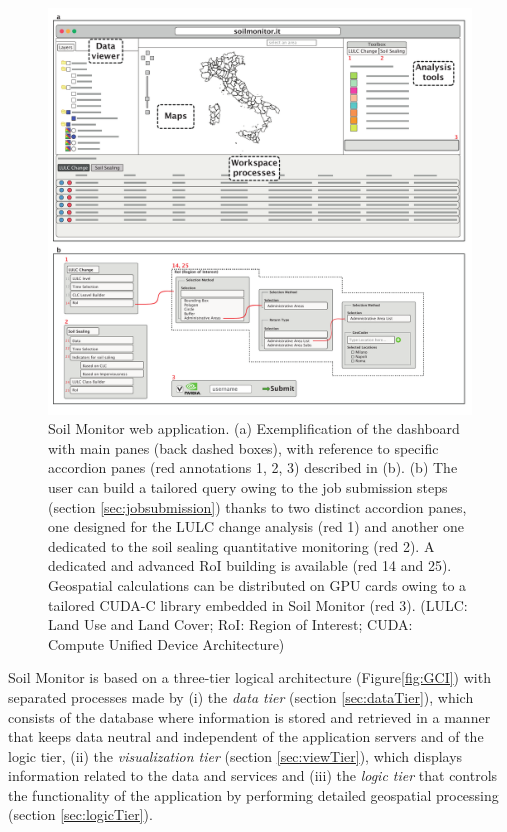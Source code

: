 \documentclass[APA,LATO1COL,doublespace]{WileyNJD-v2}
\begin{document}
\begin{figure}[t] %
    \centerline{\includegraphics[width=500pt]{01_piattaforma.pdf}}
    \caption{Soil Monitor web application.
             (a) Exemplification of the dashboard with main panes (back dashed boxes), with reference to specific accordion panes (red annotations 1, 2, 3) described in (b). 
             (b) The user can build a tailored query owing to the job submission steps (section \ref{sec:jobsubmission}) thanks to two distinct accordion panes, one designed for the LULC change analysis (red 1) and another one dedicated to the soil sealing quantitative monitoring (red 2). A dedicated and advanced RoI building is available (red 14 and 25). Geospatial calculations can be distributed on GPU cards owing to a tailored CUDA-C library embedded in Soil Monitor (red 3).
             (LULC: Land Use and Land Cover; RoI: Region of Interest; CUDA: Compute Unified Device Architecture)
            } \label{fig:SMapp}
\end{figure}

Soil Monitor is based on a three-tier logical architecture (Figure\ref{fig:GCI}) with separated processes made by 
(i) 
the \textit{data tier} (section \ref{sec:dataTier}), which consists of the database where information is stored and retrieved in a manner that keeps data neutral and independent of the application servers and of the logic tier,
(ii) the \textit{visualization tier} (section \ref{sec:viewTier}), which displays information related to the data and services
and 
(iii) 
the \textit{logic tier} that controls the functionality of the application by performing detailed geospatial processing (section \ref{sec:logicTier}).
\end{document}
